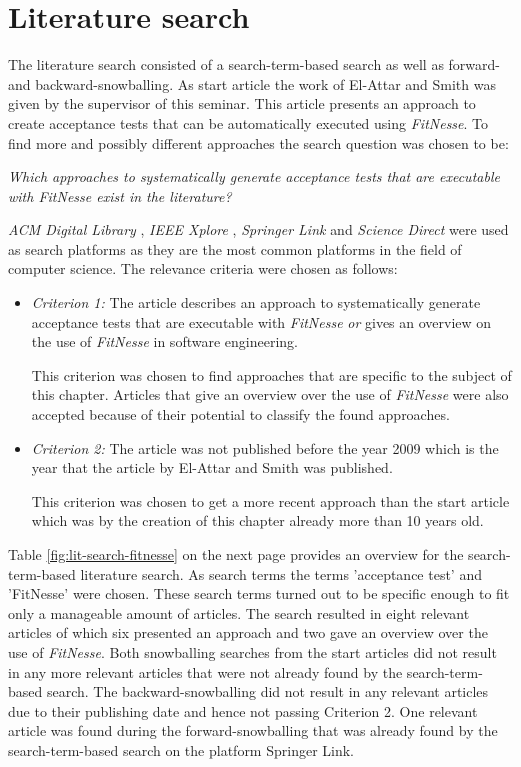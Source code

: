 \section{Literature search}
\label{sec:literature-search}

The literature search consisted of a search-term-based search as well as forward- and backward-snowballing.
As start article the work of El-Attar and Smith \cite{el-attar} was given by the supervisor of this seminar.
This article presents an approach to create acceptance tests that can be automatically executed using \textit{FitNesse}.
To find more and possibly different approaches the search question was chosen to be:

\begin{center}
\textit{
 Which approaches to systematically generate acceptance tests that are executable with \textit{FitNesse} exist in the literature?
}
\end{center}

\textit{ACM Digital Library} \cite{acm}, \textit{IEEE Xplore} \cite{ieee}, \textit{Springer Link} \cite{springer} and \textit{Science Direct} \cite{elsevier} were used as search platforms as they are the most common platforms in the field of computer science.
The relevance criteria were chosen as follows:
\begin{itemize}
	\item \textit{Criterion 1:} The article describes an approach to systematically generate acceptance tests that are executable with \textit{FitNesse} \textit{or} gives an overview on the use of \textit{FitNesse} in software engineering.
	
	This criterion was chosen to find approaches that are specific to the subject of this chapter.
	Articles that give an overview over the use of \textit{FitNesse} were also accepted because of their potential to classify the found approaches.
	
	\item \textit{Criterion 2:} The article was not published before the year 2009 which is the year that the article by El-Attar and Smith was published.
	
	This criterion was chosen to get a more recent approach than the start article which was by the creation of this chapter already more than 10 years old.
\end{itemize}

Table \ref{fig:lit-search-fitnesse} on the next page provides an overview for the search-term-based literature search.
As search terms the terms 'acceptance test' and 'FitNesse' were chosen.
These search terms turned out to be specific enough to fit only a manageable amount of articles.
The search resulted in eight relevant articles of which six presented an approach and two gave an overview over the use of \textit{FitNesse}.
Both snowballing searches from the start articles did not result in any more relevant articles that were not already found by the search-term-based search.
The backward-snowballing did not result in any relevant articles due to their publishing date and hence not passing Criterion 2.
One relevant article was found during the forward-snowballing that was already found by the search-term-based search on the platform Springer Link.

